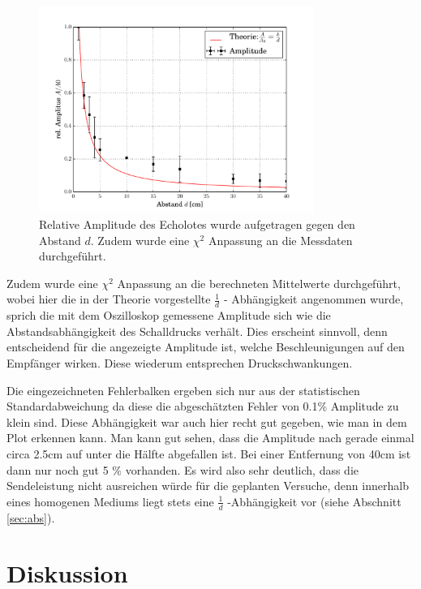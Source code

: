 \documentclass[12pt,a4paper,titlepage,headinclude,bibtotoc]{scrartcl}
\numberwithin{equation}{subsection}
\begin{document}
\begin{figure}[h]
	\centering
	\includegraphics[width=0.8\textwidth]{schall.pdf}
	\caption{Relative Amplitude des Echolotes wurde aufgetragen gegen den Abstand $d$. Zudem wurde eine $\chi^2$ Anpassung an die Messdaten durchgeführt.}
	\label{fig:schall}
\end{figure}

Zudem wurde eine $\chi^2$ Anpassung an die berechneten Mittelwerte durchgeführt, wobei hier die in der Theorie vorgestellte $\frac{1}{d}$ - Abhängigkeit angenommen wurde, sprich die mit dem Oszilloskop gemessene Amplitude sich wie die Abstandsabhängigkeit des Schalldrucks verhält.
Dies erscheint sinnvoll, denn entscheidend für die angezeigte Amplitude ist, welche Beschleunigungen auf den Empfänger wirken.
Diese wiederum entsprechen Druckschwankungen.

Die eingezeichneten Fehlerbalken ergeben sich nur aus der statistischen Standardabweichung da diese die abgeschätzten Fehler von 0.1\% Amplitude zu klein sind. Diese Abhängigkeit war auch hier recht gut gegeben, wie man in dem Plot erkennen kann. 
Man kann gut sehen, dass die Amplitude nach gerade einmal circa 2.5\si{\centi\meter} auf unter die Hälfte abgefallen ist. Bei einer Entfernung von 40\si{\centi\meter} ist dann nur noch gut 5 $\%$ vorhanden. Es wird also sehr deutlich, dass die Sendeleistung nicht ausreichen würde für die geplanten Versuche, denn innerhalb eines homogenen Mediums liegt stets eine $\frac{1}{d}$ -Abhängigkeit vor (siehe Abschnitt \ref{sec:abs}). 


\section{Diskussion}
\label{sec:diskussion}
\end{document}
